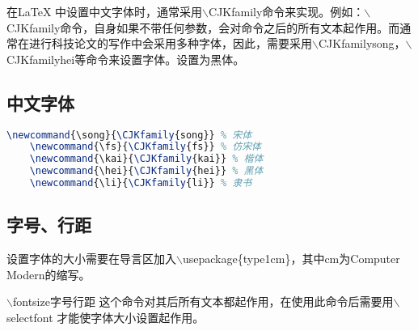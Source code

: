 \documentclass[cn,10pt,math=newtx,citestyle=gb7714-2015,bibstyle=gb7714-2015]{elegantbook}
\begin{document}
在\LaTeX{} 中设置中文字体时，通常采用$\backslash$CJKfamily{}命令来实现。例如：$\backslash$CJKfamily命令，自身如果不带任何参数，会对命令之后的所有文本起作用。而通常在进行科技论文的写作中会采用多种字体，因此，需要采用$\backslash$CJKfamily{song}，$\backslash$CJKfamily{hei}等命令来设置字体。设置为黑体。

\subsection{中文字体}

\begin{lstlisting}[language=tex]
	\newcommand{\song}{\CJKfamily{song}} % 宋体
	\newcommand{\fs}{\CJKfamily{fs}} % 仿宋体
	\newcommand{\kai}{\CJKfamily{kai}} % 楷体
	\newcommand{\hei}{\CJKfamily{hei}} % 黑体
	\newcommand{\li}{\CJKfamily{li}} % 隶书
\end{lstlisting}

\subsection{字号、行距}

设置字体的大小需要在导言区加入$\backslash$usepackage\{type1cm\}，其中cm为Computer Modern的缩写。

$\backslash$fontsize{字号}{行距}
这个命令对其后所有文本都起作用，在使用此命令后需要用$\backslash$selectfont 才能使字体大小设置起作用。


\end{document}
